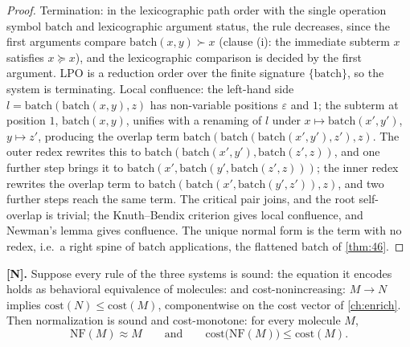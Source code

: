 \begin{proof}
Termination: in the lexicographic path order with the single operation
symbol $\mathrm{batch}$ and lexicographic argument status, the rule
decreases, since the first arguments compare
$\mathrm{batch} (x,y) \succ x$ (clause (i): the immediate subterm $x$
satisfies $x \succeq x$), and the lexicographic comparison is decided by the
first argument. LPO is a reduction order over the finite signature
$\{\mathrm{batch}\}$, so the system is terminating. Local confluence: the
left-hand side $l = \mathrm{batch} (\mathrm{batch} (x,y), z)$ has
non-variable positions $\varepsilon$ and $1$; the subterm at position $1$,
$\mathrm{batch} (x,y)$, unifies with a renaming of $l$ under
$x \mapsto \mathrm{batch} (x',y')$, $y \mapsto z'$, producing the overlap
term $\mathrm{batch} (\mathrm{batch} (\mathrm{batch} (x',y'),z'), z)$. The
outer redex rewrites this to $\mathrm{batch} (\mathrm{batch} (x',y'),
\mathrm{batch} (z',z))$, and one further step brings it to
$\mathrm{batch} (x', \mathrm{batch} (y', \mathrm{batch} (z',z)))$; the inner
redex rewrites the overlap term to
$\mathrm{batch} (\mathrm{batch} (x', \mathrm{batch} (y',z')), z)$, and two
further steps reach the same term. The critical pair joins, and the root
self-overlap is trivial; the Knuth--Bendix criterion gives local
confluence, and Newman's lemma gives confluence. The unique normal form is
the term with no redex, i.e.\ a right spine of $\mathrm{batch}$
applications, the flattened batch of \autoref{thm:46}.
\end{proof}

\begin{theorem}\label{thm:18}
\textbf{[N].} Suppose every rule of the three systems is sound: the
equation it encodes holds as behavioral equivalence of molecules: and
cost-nonincreasing: $M \to N$ implies $\mathrm{cost} (N) \leq
\mathrm{cost} (M)$, componentwise on the cost vector of
\autoref{ch:enrich}. Then normalization is sound and cost-monotone: for
every molecule $M$,
\[
\mathrm{NF} (M) \approx M
\qquad\text{and}\qquad
\mathrm{cost}\bigl (\mathrm{NF} (M)\bigr) \leq \mathrm{cost} (M) .
\]
\end{theorem}

